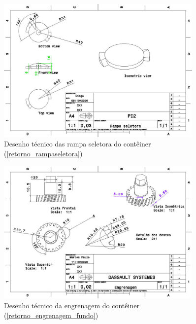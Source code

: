 \begin{apendicesenv}
\begin{figure}[H]
    \centering
    \includegraphics[width=0.9\textwidth]{figuras/estrutura/Desenhos/Drawing1_RampaSeletora.jpg}
    \caption{Desenho técnico das rampa seletora do contêiner (\ref{retorno_rampaseletora})}
    \label{fig:rampaseletora}
\end{figure}

\begin{figure}[H]
    \centering
    \includegraphics[width=0.9\textwidth]{figuras/estrutura/Desenhos/Engrenagem_Fundo.jpg}
    \caption{Desenho técnico da engrenagem do contêiner (\ref{retorno_engrenagem_fundo})}
    \label{fig:engrenagem_fundo}
\end{figure}



\end{apendicesenv}
